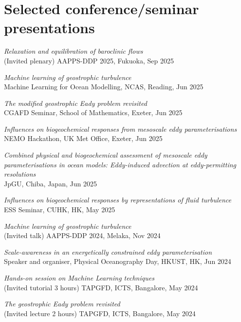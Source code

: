 \documentclass[letterpaper]{article}
\renewenvironment{itemize}{
  \begin{list}{}{
    \setlength{\leftmargin}{1.5em}
  }
}{
  \end{list}
}
\begin{document}
\section*{Selected conference/seminar presentations}
\begin{itemize}

\item[--] \textit{Relaxation and equilibration of baroclinic flows}\\
(Invited plenary) AAPPS-DDP 2025, Fukuoka, Sep 2025

\item[--] \textit{Machine learning of geostrophic turbulence}\\
Machine Learning for Ocean Modelling, NCAS, Reading, Jun 2025

\item[--] \textit{The modified geostrophic Eady problem revisited}\\
CGAFD Seminar, School of Mathematics, Exeter, Jun 2025

\item[--] \textit{Influences on biogeochemical responses from mesoscale eddy parameterisations}\\
NEMO Hackathon, UK Met Office, Exeter, Jun 2025

\item[--] \textit{Combined physical and biogeochemical assessment of mesoscale eddy parameterisations in ocean models: Eddy-induced advection at eddy-permitting resolutions}\\
JpGU, Chiba, Japan, Jun 2025

\item[--] \textit{Influences on biogeochemical responses by representations of fluid turbulence}\\
ESS Seminar, CUHK, HK, May 2025

\item[--] \textit{Machine learning of geostrophic turbulence}\\
(Invited talk) AAPPS-DDP 2024, Melaka, Nov 2024

\item[--] \textit{Scale-awareness in an energetically constrained eddy parameterisation}\\
Speaker and organiser, Physical Oceanography Day, HKUST, HK, Jun 2024

\item[--] \textit{Hands-on session on Machine Learning techniques}\\
(Invited tutorial 3 hours) TAPGFD, ICTS, Bangalore, May 2024

\item[--] \textit{The geostrophic Eady problem revisited}\\
(Invited lecture 2 hours) TAPGFD, ICTS, Bangalore, May 2024

\end{itemize}
\end{document}
